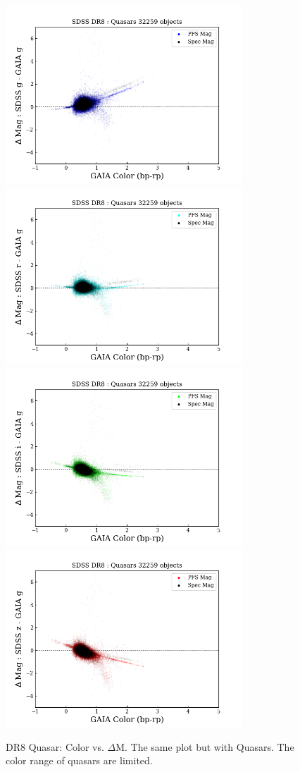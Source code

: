 \documentclass[apj,twocolumn]{aastex631}
\begin{document}
\begin{figure}%
\begin{center}
\includegraphics[angle=0,width=8.9cm]{figures/20220812_color_dmag_g_dr8quasar.png}
\includegraphics[angle=0,width=8.9cm]{figures/20220812_color_dmag_r_dr8quasar.png}
\includegraphics[angle=0,width=8.9cm]{figures/20220812_color_dmag_i_dr8quasar.png}
\includegraphics[angle=0,width=8.9cm]{figures/20220812_color_dmag_z_dr8quasar.png}
\caption{DR8 Quasar: Color vs. $\Delta$M.  The same plot but with Quasars.  The color range of quasars are limited.}
\end{center}
\end{figure}
\end{document}
